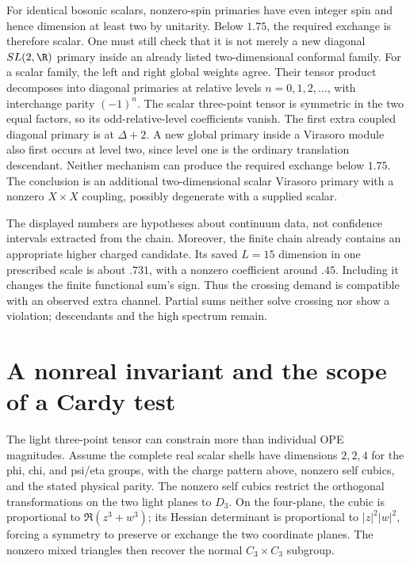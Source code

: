 For identical bosonic scalars, nonzero-spin primaries have even integer
spin and hence dimension at least two by unitarity. Below $1.75$,
the required exchange is therefore scalar. One must still check
that it is not merely a new diagonal $SL(2,\R)$ primary inside an
already listed two-dimensional conformal family. For a scalar
family, the left and right global weights agree. Their tensor
product decomposes into diagonal primaries at relative levels
$n=0,1,2,\ldots$, with interchange parity $(-1)^n$. The scalar
three-point tensor is symmetric in the two equal factors, so its
odd-relative-level coefficients vanish. The first extra coupled
diagonal primary is at $\Delta+2$. A new global primary inside a
Virasoro module also first occurs at level two, since level one is
the ordinary translation descendant. Neither mechanism can produce
the required exchange below $1.75$. The conclusion is an additional
two-dimensional scalar Virasoro primary with a nonzero
$X\times X$ coupling, possibly degenerate with a supplied scalar.

The displayed numbers are hypotheses about continuum data, not
confidence intervals extracted from the chain. Moreover, the finite
chain already contains an appropriate higher charged candidate.
Its saved $L=15$ dimension in one prescribed scale is about $.731$,
with a nonzero coefficient around $.45$. Including it changes the
finite functional sum's sign. Thus the crossing demand is compatible
with an observed extra channel. Partial sums neither solve crossing
nor show a violation; descendants and the high spectrum remain.

\section{A nonreal invariant and the scope of a Cardy test}

The light three-point tensor can constrain more than individual OPE
magnitudes. Assume the complete real scalar shells have dimensions
$2,2,4$ for the phi, chi, and psi/eta groups, with the charge pattern
above, nonzero self cubics, and the stated physical parity. The
nonzero self cubics restrict the orthogonal transformations on the
two light planes to $D_3$. On the four-plane, the cubic is
proportional to $\Re(z^3+w^3)$; its Hessian determinant is
proportional to $|z|^2|w|^2$, forcing a symmetry to preserve or
exchange the two coordinate planes. The nonzero mixed triangles
then recover the normal $C_3\times C_3$ subgroup.

